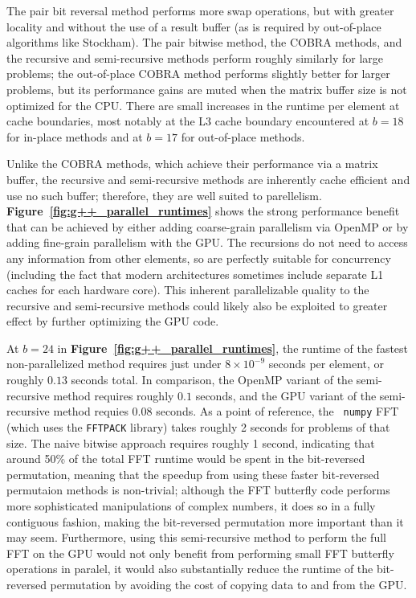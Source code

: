 \documentclass[10pt]{article}
\begin{document}
The pair bit reversal method performs more swap operations, but with
greater locality and without the use of a result buffer (as is
required by out-of-place algorithms like Stockham). The pair bitwise
method, the COBRA methods, and the recursive and semi-recursive
methods perform roughly similarly for large problems; the out-of-place
COBRA method performs slightly better for larger problems, but its
performance gains are muted when the matrix buffer size is not
optimized for the CPU. There are small increases in the runtime per
element at cache boundaries, most notably at the L3 cache boundary
encountered at $b=18$ for in-place methods and at $b=17$ for
out-of-place methods.

Unlike the COBRA methods, which achieve their performance via a matrix
buffer, the recursive and semi-recursive methods are inherently cache
efficient and use no such buffer; therefore, they are well suited to
parellelism. {\bf Figure~\ref{fig:g++_parallel_runtimes}} shows the
strong performance benefit that can be achieved by either adding
coarse-grain parallelism via OpenMP or by adding fine-grain
parallelism with the GPU. The recursions do not need to access any
information from other elements, so are perfectly suitable for
concurrency (including the fact that modern architectures sometimes
include separate L1 caches for each hardware core). This inherent
parallelizable quality to the recursive and semi-recursive methods
could likely also be exploited to greater effect by further optimizing
the GPU code.

At $b=24$ in {\bf Figure~\ref{fig:g++_parallel_runtimes}}, the runtime of
the fastest non-parallelized method requires just under $8 \times
{10}^{-9}$ seconds per element, or roughly $0.13$ seconds total. In
comparison, the OpenMP variant of the semi-recursive method requires
roughly $0.1$ seconds, and the GPU variant of the semi-recursive
method requies $0.08$ seconds. As a point of reference, the {\tt
  numpy} FFT (which uses the {\tt FFTPACK} library) takes roughly 2
seconds for problems of that size. The naive bitwise approach requires
roughly 1 second, indicating that around 50\% of the total FFT runtime
would be spent in the bit-reversed permutation, meaning that the
speedup from using these faster bit-reversed permutaion methods is
non-trivial; although the FFT butterfly code performs more
sophisticated manipulations of complex numbers, it does so in a fully
contiguous fashion, making the bit-reversed permutation more important
than it may seem. Furthermore, using this semi-recursive method to
perform the full FFT on the GPU would not only benefit from performing
small FFT butterfly operations in paralel, it would also substantially
reduce the runtime of the bit-reversed permutation by avoiding the
cost of copying data to and from the GPU.
\end{document}
